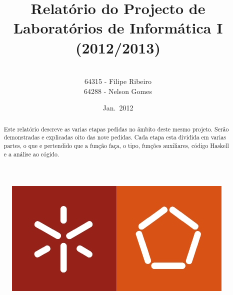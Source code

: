 \documentclass[a4paper]{article}
\title{Relatório do Projecto de Laboratórios de Informática I (2012/2013)}
\author{
\\
	64315 - Filipe Ribeiro
\\
	64288 - Nelson Gomes
}
\date{Jan.\ 2012}
\begin{document}
\begin{figure}
\begin{center}
\includegraphics[]{UM.jpg}
\end{center}
\end{figure}
\maketitle
\newpage
\begin{abstract}
Este relatório descreve as varias etapas pedidas no âmbito deste mesmo projeto. Serão demonstradas e explicadas oito das nove pedidas. Cada etapa esta dividida em varias partes, o que e pertendido que a função faça, o tipo, funções auxiliares, código Haskell e a análise ao cógido.
\end{abstract}
\end{document}
